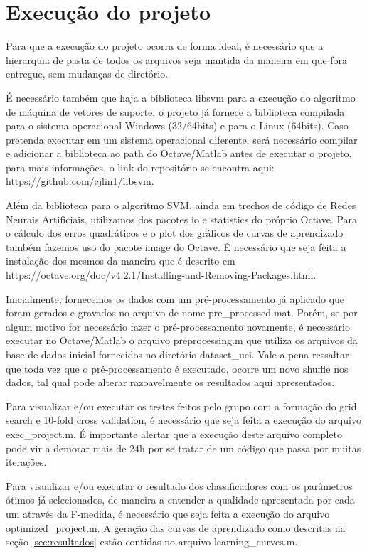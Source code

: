 \documentclass[10pt, conference, compsocconf]{IEEEtran}
\begin{document}
\clearpage
\appendix
\section{Execução do projeto}\label{apendice_execucao}
Para que a execução do projeto ocorra de forma ideal, é necessário que a 
hierarquia de pasta de todos os arquivos seja mantida da maneira em que fora 
entregue, sem mudanças de diretório.

É necessário também que haja a biblioteca libsvm para a execução do algoritmo 
de máquina de vetores de suporte, o projeto já fornece a biblioteca compilada 
para o sistema operacional Windows (32/64bits) e para o Linux (64bits). 
Caso pretenda executar em um sistema operacional diferente, será necessário 
compilar e adicionar a biblioteca ao path do Octave/Matlab antes de executar o 
projeto, para mais informações, o link do repositório se encontra aqui: https://github.com/cjlin1/libsvm.

Além da biblioteca para o algoritmo SVM, ainda em trechos de código de Redes 
Neurais Artificiais, utilizamos dos pacotes io e statistics do próprio Octave. 
Para o cálculo dos erros quadráticos e o plot dos gráficos de curvas de 
aprendizado também fazemos uso do pacote image do Octave. É necessário que 
seja feita a instalação dos mesmos da maneira que é descrito em https://octave.org/doc/v4.2.1/Installing-and-Removing-Packages.html. 

Inicialmente, fornecemos os dados com um pré-processamento já aplicado que 
foram gerados e gravados no arquivo de nome pre\_processed.mat. Porém, se por 
algum motivo for necessário fazer o pré-processamento novamente, é necessário 
executar no Octave/Matlab o arquivo preprocessing.m que utiliza os arquivos da 
base de dados inicial fornecidos no diretório dataset\_uci. Vale a pena 
ressaltar que toda vez que o pré-processamento é executado, ocorre um novo 
shuffle nos dados, tal qual pode alterar razoavelmente os resultados aqui apresentados.

Para visualizar e/ou executar os testes feitos pelo grupo com a formação do 
grid search e 10-fold cross validation, é necessário que seja feita a execução 
do arquivo exec\_project.m. É importante alertar que a execução deste arquivo 
completo pode vir a demorar mais de 24h por se tratar de um código que passa 
por muitas iterações.

Para visualizar e/ou executar o resultado dos classificadores com os parâmetros
ótimos já selecionados, de maneira a entender a qualidade apresentada por cada 
um através da F-medida, é necessário que seja feita a execução do arquivo 
optimized\_project.m.
A geração das curvas de aprendizado como descritas na seção
\ref{sec:resultados} estão contidas no arquivo learning\_curves.m.
\end{document}
